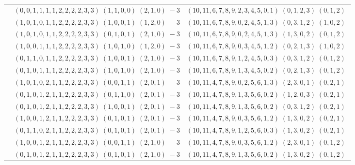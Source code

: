 \documentclass[11pt]{article}
\begin{document}
\begin{longtable}[l]{|c|c|c|}
 \cline{2-3} 
 & $(0 ,0 ,1 ,1 ,1 ,1 ,2 ,2 ,2 ,2 ,3 ,3) \;(1 ,1 ,0 ,0) \;(2 ,1 ,0) \;-3$ & $(10 ,11 ,6 ,7 ,8 ,9 ,2 ,3 ,4 ,5 ,0 ,1) \;(0 ,1 ,2 ,3) \;(0 ,1 ,2) \;$\\ 
 \cline{2-3} 
 & $(1 ,0 ,1 ,0 ,1 ,1 ,2 ,2 ,2 ,2 ,3 ,3) \;(1 ,0 ,0 ,1) \;(1 ,2 ,0) \;-3$ & $(10 ,11 ,6 ,7 ,8 ,9 ,0 ,2 ,4 ,5 ,1 ,3) \;(0 ,3 ,1 ,2) \;(1 ,0 ,2) \;$\\ 
 \cline{2-3} 
 & $(1 ,0 ,1 ,0 ,1 ,1 ,2 ,2 ,2 ,2 ,3 ,3) \;(0 ,1 ,0 ,1) \;(2 ,1 ,0) \;-3$ & $(10 ,11 ,6 ,7 ,8 ,9 ,0 ,2 ,4 ,5 ,1 ,3) \;(1 ,3 ,0 ,2) \;(0 ,1 ,2) \;$\\ 
 \cline{2-3} 
 & $(1 ,0 ,0 ,1 ,1 ,1 ,2 ,2 ,2 ,2 ,3 ,3) \;(1 ,0 ,1 ,0) \;(1 ,2 ,0) \;-3$ & $(10 ,11 ,6 ,7 ,8 ,9 ,0 ,3 ,4 ,5 ,1 ,2) \;(0 ,2 ,1 ,3) \;(1 ,0 ,2) \;$\\ 
 \cline{2-3} 
 & $(0 ,1 ,1 ,0 ,1 ,1 ,2 ,2 ,2 ,2 ,3 ,3) \;(1 ,0 ,0 ,1) \;(2 ,1 ,0) \;-3$ & $(10 ,11 ,6 ,7 ,8 ,9 ,1 ,2 ,4 ,5 ,0 ,3) \;(0 ,3 ,1 ,2) \;(0 ,1 ,2) \;$\\ 
 \cline{2-3} 
 & $(0 ,1 ,0 ,1 ,1 ,1 ,2 ,2 ,2 ,2 ,3 ,3) \;(1 ,0 ,1 ,0) \;(2 ,1 ,0) \;-3$ & $(10 ,11 ,6 ,7 ,8 ,9 ,1 ,3 ,4 ,5 ,0 ,2) \;(0 ,2 ,1 ,3) \;(0 ,1 ,2) \;$\\ 
 \cline{2-3} 
 & $(1 ,0 ,1 ,0 ,2 ,1 ,1 ,2 ,2 ,2 ,3 ,3) \;(0 ,0 ,1 ,1) \;(2 ,0 ,1) \;-3$ & $(10 ,11 ,4 ,7 ,8 ,9 ,0 ,2 ,5 ,6 ,1 ,3) \;(2 ,3 ,0 ,1) \;(0 ,2 ,1) \;$\\ 
 \cline{2-3} 
 & $(0 ,1 ,0 ,1 ,2 ,1 ,1 ,2 ,2 ,2 ,3 ,3) \;(0 ,1 ,1 ,0) \;(2 ,0 ,1) \;-3$ & $(10 ,11 ,4 ,7 ,8 ,9 ,1 ,3 ,5 ,6 ,0 ,2) \;(1 ,2 ,0 ,3) \;(0 ,2 ,1) \;$\\ 
 \cline{2-3} 
 & $(0 ,1 ,0 ,1 ,2 ,1 ,1 ,2 ,2 ,2 ,3 ,3) \;(1 ,0 ,0 ,1) \;(2 ,0 ,1) \;-3$ & $(10 ,11 ,4 ,7 ,8 ,9 ,1 ,3 ,5 ,6 ,0 ,2) \;(0 ,3 ,1 ,2) \;(0 ,2 ,1) \;$\\ 
 \cline{2-3} 
 & $(1 ,0 ,0 ,1 ,2 ,1 ,1 ,2 ,2 ,2 ,3 ,3) \;(0 ,1 ,0 ,1) \;(2 ,0 ,1) \;-3$ & $(10 ,11 ,4 ,7 ,8 ,9 ,0 ,3 ,5 ,6 ,1 ,2) \;(1 ,3 ,0 ,2) \;(0 ,2 ,1) \;$\\ 
 \cline{2-3} 
 & $(0 ,1 ,1 ,0 ,2 ,1 ,1 ,2 ,2 ,2 ,3 ,3) \;(0 ,1 ,0 ,1) \;(2 ,0 ,1) \;-3$ & $(10 ,11 ,4 ,7 ,8 ,9 ,1 ,2 ,5 ,6 ,0 ,3) \;(1 ,3 ,0 ,2) \;(0 ,2 ,1) \;$\\ 
 \cline{2-3} 
 & $(1 ,0 ,0 ,1 ,2 ,1 ,1 ,2 ,2 ,2 ,3 ,3) \;(0 ,0 ,1 ,1) \;(2 ,1 ,0) \;-3$ & $(10 ,11 ,4 ,7 ,8 ,9 ,0 ,3 ,5 ,6 ,1 ,2) \;(2 ,3 ,0 ,1) \;(0 ,1 ,2) \;$\\ 
 \cline{2-3} 
 & $(0 ,1 ,0 ,1 ,2 ,1 ,1 ,2 ,2 ,2 ,3 ,3) \;(0 ,1 ,0 ,1) \;(2 ,1 ,0) \;-3$ & $(10 ,11 ,4 ,7 ,8 ,9 ,1 ,3 ,5 ,6 ,0 ,2) \;(1 ,3 ,0 ,2) \;(0 ,1 ,2) \;$\\ 

\end{longtable}
\end{document}
